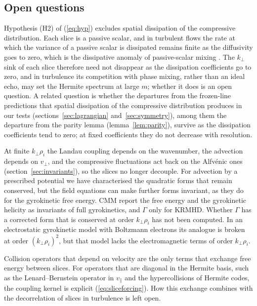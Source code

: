 \subsection{Open questions}\label{dis:open}

Hypothesis (H2) of (\ref{eq:hyp}) excludes spatial dissipation of the compressive distribution. Each slice is a passive scalar, and in turbulent flows the rate at which the variance of a passive scalar is dissipated remains finite as the diffusivity goes to zero, which is the dissipative anomaly of passive-scalar mixing \citep{ShraimanSiggia2000,FalkovichGawedzkiVergassola2001}. The $k_\perp$ sink of each slice therefore need not disappear as the dissipation coefficients go to zero, and in turbulence its competition with phase mixing, rather than an ideal echo, may set the Hermite spectrum at large $m$; whether it does is an open question. A related question is whether the departures from the frozen-line predictions that spatial dissipation of the compressive distribution produces in our tests (sections~\ref{sec:lagrangian} and~\ref{sec:symmetry}), among them the departure from the parity lemma (lemma~\ref{lem:parity}), survive as the dissipation coefficients tend to zero; at fixed coefficients they do not decrease with resolution.

At finite $k_\perp\rho_i$ the Landau coupling depends on the wavenumber, the advection depends on $v_\perp$, and the compressive fluctuations act back on the Alfv\'enic ones (section~\ref{sec:invariants}), so the slices no longer decouple. For advection by a prescribed potential we have characterised the quadratic forms that remain conserved, but the field equations can make further forms invariant, as they do for the gyrokinetic free energy. CMM report the free energy and the gyrokinetic helicity as invariants of full gyrokinetics, and $\Gamma$ only for KRMHD. Whether $\Gamma$ has a corrected form that is conserved at order $k_\perp\rho_i$ has not been computed. In an electrostatic gyrokinetic model with Boltzmann electrons its analogue is broken at order $(k_\perp\rho_i)^2$, but that model lacks the electromagnetic terms of order $k_\perp\rho_i$.

Collision operators that depend on velocity are the only terms that exchange free energy between slices. For operators that are diagonal in the Hermite basis, such as the Lenard--Bernstein operator in $v_\parallel$ and the hypercollisions of Hermite codes, the coupling kernel is explicit (\ref{eq:sliceforcing}). How this exchange combines with the decorrelation of slices in turbulence is left open.

